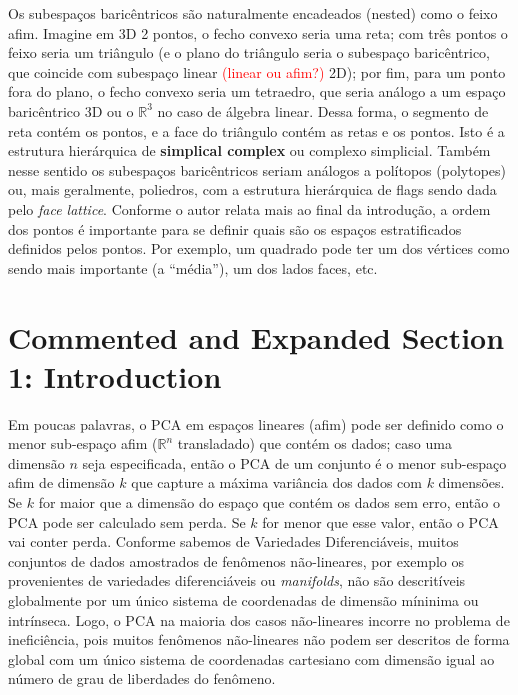 \documentclass[a4paper,titlepage]{article}
\newcommand{\juliana}[1]{\textcolor{red}{#1}}
\begin{document}
Os subespaços baricêntricos são naturalmente encadeados (nested) como o feixo
afim. Imagine em 3D 2 pontos, o fecho convexo seria uma reta; com três pontos o
feixo seria um triângulo (e o plano do triângulo seria o subespaço
baricêntrico, que coincide com subespaço linear \juliana{(linear ou afim?)} 2D); por fim, para um ponto fora do plano, o fecho convexo seria um tetraedro, que seria análogo a um espaço baricêntrico 3D ou o $\mathbb R^3$ no caso de álgebra linear. Dessa forma, o segmento de reta contém os pontos, e a face do triângulo contém as retas e os pontos. Isto é a estrutura hierárquica de \textbf{simplical complex}
ou complexo simplicial. Também nesse sentido os subespaços baricêntricos seriam
análogos a polítopos (polytopes) ou, mais geralmente, poliedros, com a estrutura
hierárquica de flags sendo dada pelo \emph{face lattice}. Conforme o autor
relata mais ao final da introdução, a ordem dos pontos é importante para se
definir quais são os espaços estratificados definidos pelos pontos. Por exemplo,
um quadrado pode ter um dos vértices como sendo mais importante (a ``média''),
um dos lados faces, etc. 

\section{Commented and Expanded Section 1: Introduction}\label{sec:intro}

\begin{center}
\vspace{1em}
\vspace{1em}
\end{center}

Em poucas palavras, o PCA em espaços lineares (afim) pode ser definido
como o menor sub-espaço afim ($\mathbb R^n$ transladado) que contém os dados;
caso uma dimensão $n$ seja especificada, então o PCA de um conjunto é 
o menor sub-espaço afim de dimensão $k$ que capture a máxima variância dos dados
com $k$ dimensões. Se $k$ for maior que a dimensão do espaço que contém os dados
sem erro, então o PCA pode ser calculado sem perda. Se $k$ for menor que esse
valor, então o PCA vai conter perda. Conforme sabemos de Variedades
Diferenciáveis, muitos conjuntos de dados amostrados de fenômenos não-lineares,
por exemplo os provenientes de variedades diferenciáveis ou \emph{manifolds},
não são descritíveis globalmente por um único sistema de coordenadas de dimensão
míninima ou intrínseca. Logo, o PCA na maioria dos casos não-lineares incorre no
problema de ineficiência, pois muitos fenômenos não-lineares não podem ser
descritos de forma global com um único sistema de coordenadas cartesiano com
dimensão igual ao número de grau de liberdades do fenômeno.
\end{document}
